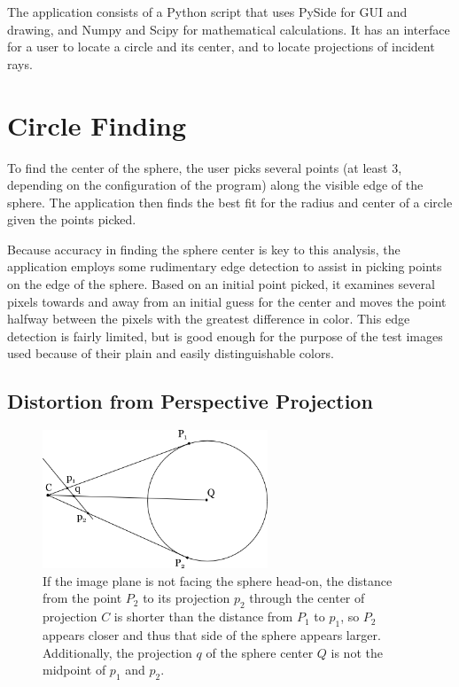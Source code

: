 \documentclass{thesis}
\begin{document}
The application consists of a Python script that uses PySide for GUI and drawing, and Numpy and Scipy for mathematical calculations. It has an interface for a user to locate a circle and its center, and to locate projections of incident rays.

\section{Circle Finding}
To find the center of the sphere, the user picks several points (at least 3, depending on the configuration of the program) along the visible edge of the sphere. The application then finds the best fit for the radius and center of a circle given the points picked.

Because accuracy in finding the sphere center is key to this analysis, the application employs some rudimentary edge detection to assist in picking points on the edge of the sphere. Based on an initial point picked, it examines several pixels towards and away from an initial guess for the center and moves the point halfway between the pixels with the greatest difference in color. This edge detection is fairly limited, but is good enough for the purpose of the test images used because of their plain and easily distinguishable colors.

\subsection{Distortion from Perspective Projection}
\label{sec:perspective-distortion}

\begin{figure}
	\centering
    	\includegraphics[width=0.6\textwidth]{sphere-distortion}
	\caption{If the image plane is not facing the sphere head-on, the distance from the point $P_2$ to its projection $p_2$ through the center of projection $C$ is shorter than the distance from $P_1$ to $p_1$, so $P_2$ appears closer and thus that side of the sphere appears larger. Additionally, the projection $q$ of the sphere center $Q$ is not the midpoint of $p_1$ and $p_2$.}
	\label{sphere-distortion}
\end{figure}
\end{document}
